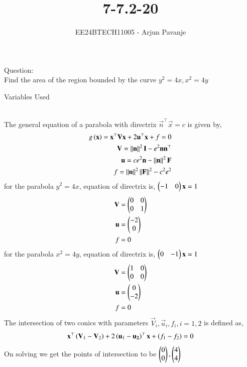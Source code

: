 \documentclass[journal]{IEEEtran}
\begin{document}

\vspace{3cm}

\title{7-7.2-20}
\author{EE24BTECH11005 - Arjun Pavanje}
{\let\newpage\relax\maketitle}
Question:\\
Find the area of the region bounded by the curve $y^2=4x, x^2=4y$
\begin{table}[h!]    
  \centering
  
  \caption{Variables Used}
  \label{tab1-1.9-6}
\end{table}\\
\solution
The general equation of a parabola with directrix $\vec{n}^{\top}\vec{x}=c$ is given by,
\begin{align}
	g\left(\mathbf{x}\right)=\mathbf{x}^{\top}\mathbf{V}\mathbf{x}+2\mathbf{u}^{\top}\mathbf{x}+f=0\\
	\mathbf{V}=\left\lVert\mathbf{n}\right\rVert^2\mathbf{I}-e^2\mathbf{n}\mathbf{n}^{\top}\\
	\mathbf{u}=ce^2\mathbf{n}-\left\lVert\mathbf{n}\right\rVert^2\mathbf{F}\\
	f=\left\lVert\mathbf{n}\right\rVert^2\left\lVert\mathbf{F}\right\rVert^2-c^2e^2
\end{align}
for the parabola $y^2=4x$, equation of directrix is, $\begin{pmatrix}-1&0\end{pmatrix}\mathbf{x}=1$
\begin{align}
	\mathbf{V}&=\begin{pmatrix}0&0\\0&1\end{pmatrix}\\
	\mathbf{u}&=\begin{pmatrix}-2\\0\end{pmatrix}\\
	f&=0
\end{align}
for the parabola $x^2=4y$, equation of directrix is, $\begin{pmatrix}0&-1\end{pmatrix}\mathbf{x}=1$
\begin{align}
	\mathbf{V}&=\begin{pmatrix}1&0\\0&0\end{pmatrix}\\
	\mathbf{u}&=\begin{pmatrix}0\\-2\end{pmatrix}\\
	f&=0
\end{align}
The intersection of two conics with parameters $\vec{V}_i,\vec{u}_i,f_i, i=1,2$ is defined as,
\begin{align}
	\mathbf{x}^{\top}\left(\mathbf{V}_1-\mathbf{V}_2\right)+2\left(\mathbf{u}_1-\mathbf{u_2}\right)^{\top}\mathbf{x}+\left(f_1-f_2\right)=0
\end{align} 
On solving we get the points of intersection to be $\begin{pmatrix}0\\0\end{pmatrix},\begin{pmatrix}4\\4\end{pmatrix}$
\end{document}
